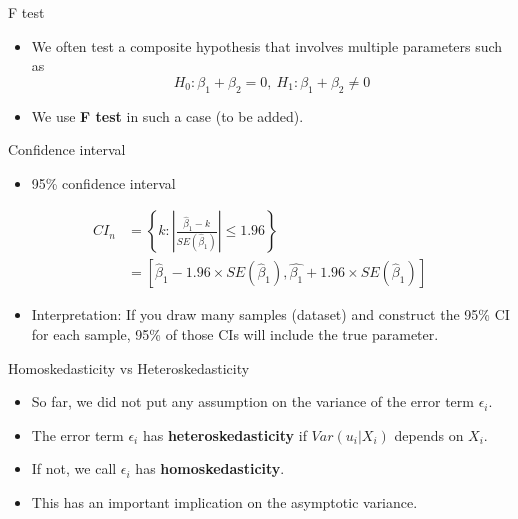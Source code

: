 \documentclass[
  ignorenonframetext,
]{beamer}
\providecommand{\tightlist}{%
  \setlength{\itemsep}{0pt}\setlength{\parskip}{0pt}}
\begin{document}
\begin{frame}{F test}
\protect\hypertarget{f-test}{}

\begin{itemize}
\tightlist
\item
  We often test a composite hypothesis that involves multiple parameters
  such as \[
   H_{0}:\beta_{1} + \beta_2 = 0,\ H_{1}:\beta_{1} + \beta_2 \neq 0
  \]
\item
  We use \textbf{F test} in such a case (to be added).
\end{itemize}

\end{frame}

\begin{frame}{Confidence interval}
\protect\hypertarget{confidence-interval}{}

\begin{itemize}
\tightlist
\item
  95\% confidence interval
\end{itemize}

\begin{align}
    CI_{n}  &= \left\{ k:|\frac{\hat{\beta}_{1}-k}{SE(\hat{\beta}_{1})}|\leq1.96\right\} \\
        &= \left[\hat{\beta}_{1}-1.96\times SE(\hat{\beta}_{1}),\hat{\beta_{1}}+1.96\times SE(\hat{\beta}_{1})\right]
\end{align}

\begin{itemize}
\tightlist
\item
  Interpretation: If you draw many samples (dataset) and construct the
  95\% CI for each sample, 95\% of those CIs will include the true
  parameter.
\end{itemize}

\end{frame}

\begin{frame}{Homoskedasticity vs Heteroskedasticity}
\protect\hypertarget{homoskedasticity-vs-heteroskedasticity}{}

\begin{itemize}
\tightlist
\item
  So far, we did not put any assumption on the variance of the error
  term \(\epsilon_i\).
\item
  The error term \(\epsilon_{i}\) has \textbf{heteroskedasticity} if
  \(Var(u_{i}|X_{i})\) depends on \(X_{i}\).
\item
  If not, we call \(\epsilon_{i}\) has \textbf{homoskedasticity}.
\item
  This has an important implication on the asymptotic variance.
\end{itemize}

\end{frame}
\end{document}
